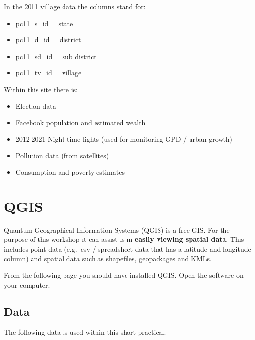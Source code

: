\documentclass[
  letterpaper,
]{scrbook}
\providecommand{\tightlist}{%
  \setlength{\itemsep}{0pt}\setlength{\parskip}{0pt}}\usepackage{longtable,booktabs,array}
\begin{document}
In the 2011 village data the columns stand for:

\begin{itemize}
\tightlist
\item
  pc11\_s\_id = state
\item
  pc11\_d\_id = district
\item
  pc11\_sd\_id = sub district
\item
  pc11\_tv\_id = village
\end{itemize}

Within this site there is:

\begin{itemize}
\tightlist
\item
  Election data
\item
  Facebook population and estimated wealth
\item
  2012-2021 Night time lights (used for monitoring GPD / urban growth)
\item
  Pollution data (from satellites)
\item
  Consumption and poverty estimates
\end{itemize}


\hypertarget{qgis-1}{%
\chapter{QGIS}\label{qgis-1}}

Quantum Geographical Information Systems (QGIS) is a free GIS. For the
purpose of this workshop it can assist is in \textbf{easily viewing
spatial data}. This includes point data (e.g.~csv / spreadsheet data
that has a latitude and longitude column) and spatial data such as
shapefiles, geopackages and KMLs.

From the following page you should have installed QGIS. Open the
software on your computer.

\hypertarget{data}{%
\section{Data}\label{data}}

The following data is used within this short practical.
\end{document}
